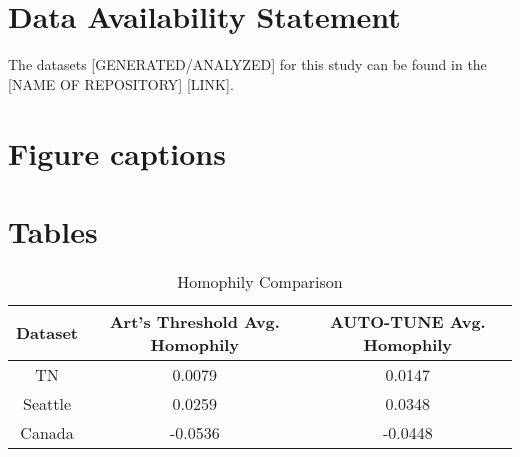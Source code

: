 \documentclass[utf8]{FrontiersinHarvard} %
\begin{document}
\section*{Data Availability Statement}
The datasets [GENERATED/ANALYZED] for this study can be found in the [NAME OF REPOSITORY] [LINK].


\nocite{*}


\section*{Figure captions}

\section*{Tables}
\begin{table}[ht]
\caption{Homophily Comparison}
\vspace{10pt}
\centering
\label{tab:homophily}
\begin{tabular}{|c|c|c|}
\hline
Dataset & Art's Threshold Avg. Homophily & AUTO-TUNE Avg. Homophily \\
\hline
TN & 0.0079 & 0.0147 \\
Seattle & 0.0259 & 0.0348 \\
Canada & -0.0536 & -0.0448 \\
\hline
\end{tabular}
\end{table}
\end{document}
